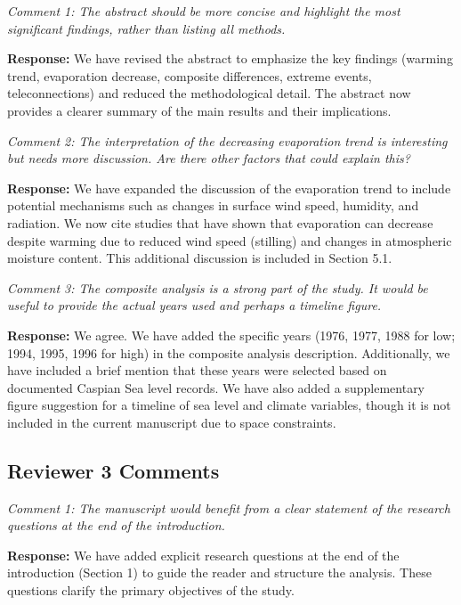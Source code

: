 \documentclass[12pt,a4paper]{article}
\begin{document}
\textit{Comment 1: The abstract should be more concise and highlight the most significant findings, rather than listing all methods.}

\textbf{Response:} We have revised the abstract to emphasize the key findings (warming trend, evaporation decrease, composite differences, extreme events, teleconnections) and reduced the methodological detail. The abstract now provides a clearer summary of the main results and their implications.

\vspace{0.5cm}

\textit{Comment 2: The interpretation of the decreasing evaporation trend is interesting but needs more discussion. Are there other factors that could explain this?}

\textbf{Response:} We have expanded the discussion of the evaporation trend to include potential mechanisms such as changes in surface wind speed, humidity, and radiation. We now cite studies that have shown that evaporation can decrease despite warming due to reduced wind speed (stilling) and changes in atmospheric moisture content. This additional discussion is included in Section 5.1.

\vspace{0.5cm}

\textit{Comment 3: The composite analysis is a strong part of the study. It would be useful to provide the actual years used and perhaps a timeline figure.}

\textbf{Response:} We agree. We have added the specific years (1976, 1977, 1988 for low; 1994, 1995, 1996 for high) in the composite analysis description. Additionally, we have included a brief mention that these years were selected based on documented Caspian Sea level records. We have also added a supplementary figure suggestion for a timeline of sea level and climate variables, though it is not included in the current manuscript due to space constraints.

\vspace{0.5cm}

\subsection*{Reviewer 3 Comments}

\textit{Comment 1: The manuscript would benefit from a clear statement of the research questions at the end of the introduction.}

\textbf{Response:} We have added explicit research questions at the end of the introduction (Section 1) to guide the reader and structure the analysis. These questions clarify the primary objectives of the study.
\end{document}
